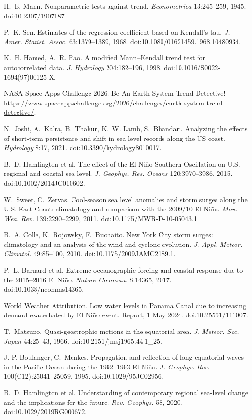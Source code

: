 \documentclass[10pt]{article}
\begin{document}
{\begin{enumerate}[label={[\arabic*]},leftmargin=2.2em]
\item H.~B. Mann. Nonparametric tests against trend. \emph{Econometrica} 13:245--259, 1945. doi:10.2307/1907187.
\item P.~K. Sen. Estimates of the regression coefficient based on Kendall's tau. \emph{J. Amer. Statist. Assoc.} 63:1379--1389, 1968. doi:10.1080/01621459.1968.10480934.
\item K.~H. Hamed, A.~R. Rao. A modified Mann--Kendall trend test for autocorrelated data. \emph{J. Hydrology} 204:182--196, 1998. doi:10.1016/S0022-1694(97)00125-X.
\item NASA Space Apps Challenge 2026. Be An Earth System Trend Detective! \url{https://www.spaceappschallenge.org/2026/challenges/earth-system-trend-detective/}.
\item N.~Joshi, A.~Kalra, B.~Thakur, K.~W. Lamb, S.~Bhandari. Analyzing the effects of short-term persistence and shift in sea level records along the US coast. \emph{Hydrology} 8:17, 2021. doi:10.3390/hydrology8010017.
\item B.~D. Hamlington et al. The effect of the El Ni\~no-Southern Oscillation on U.S. regional and coastal sea level. \emph{J. Geophys. Res. Oceans} 120:3970--3986, 2015. doi:10.1002/2014JC010602.
\item W.~Sweet, C.~Zervas. Cool-season sea level anomalies and storm surges along the U.S. East Coast: climatology and comparison with the 2009/10 El Ni\~no. \emph{Mon. Wea. Rev.} 139:2290--2299, 2011. doi:10.1175/MWR-D-10-05043.1.
\item B.~A. Colle, K.~Rojowsky, F.~Buonaito. New York City storm surges: climatology and an analysis of the wind and cyclone evolution. \emph{J. Appl. Meteor. Climatol.} 49:85--100, 2010. doi:10.1175/2009JAMC2189.1.
\item P.~L. Barnard et al. Extreme oceanographic forcing and coastal response due to the 2015--2016 El Ni\~no. \emph{Nature Commun.} 8:14365, 2017. doi:10.1038/ncomms14365.
\item World Weather Attribution. Low water levels in Panama Canal due to increasing demand exacerbated by El Ni\~no event. Report, 1 May 2024. doi:10.25561/111007.
\item T.~Matsuno. Quasi-geostrophic motions in the equatorial area. \emph{J. Meteor. Soc. Japan} 44:25--43, 1966. doi:10.2151/jmsj1965.44.1\_25.
\item J.-P. Boulanger, C.~Menkes. Propagation and reflection of long equatorial waves in the Pacific Ocean during the 1992--1993 El Ni\~no. \emph{J. Geophys. Res.} 100(C12):25041--25059, 1995. doi:10.1029/95JC02956.
\item B.~D. Hamlington et al. Understanding of contemporary regional sea-level change and the implications for the future. \emph{Rev. Geophys.} 58, 2020. doi:10.1029/2019RG000672.
\end{enumerate}}
\end{document}

